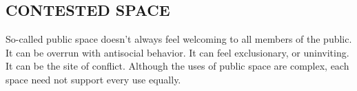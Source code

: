 \subsection*{\normalsize{} CONTESTED SPACE{\hfill \sensory}}\label{pat:contested-space}

So-called public space doesn’t always feel welcoming to all members of the public.  It can be overrun with antisocial behavior.  It can feel exclusionary, or uninviting.  It can be the site of conflict.  Although the uses of public space are complex, each space need not support every use equally.
